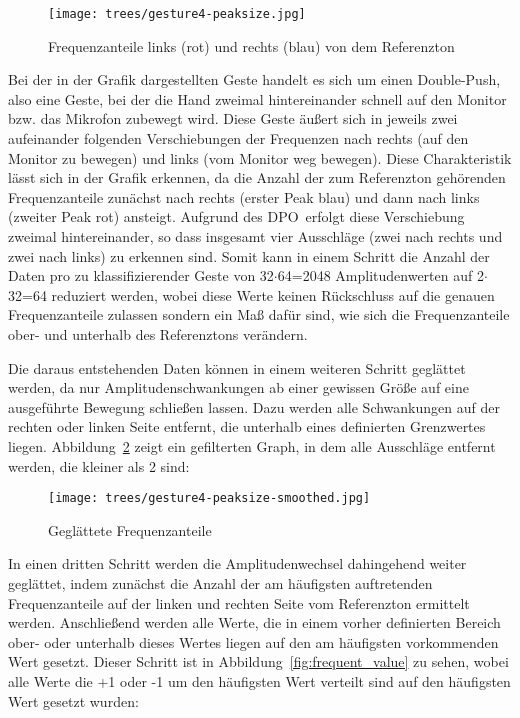 \begin{figure}[htbp] \centering
\texttt{[image: trees/gesture4-peaksize.jpg]}
\caption{Frequenzanteile links (rot) und rechts (blau) von dem Referenzton}
\label{fig:sum_of_bins}
\end{figure}

Bei der in der Grafik dargestellten Geste handelt es sich um einen \glqq Double-Push\grqq , also eine Geste, bei der die Hand zweimal 
hintereinander schnell auf den Monitor bzw. das Mikrofon zubewegt wird. Diese Geste äußert sich in jeweils zwei aufeinander folgenden 
Verschiebungen der Frequenzen nach rechts (auf den Monitor zu bewegen) und links (vom Monitor weg bewegen). 
Diese Charakteristik lässt sich in der Grafik erkennen, da die Anzahl der zum Referenzton gehörenden Frequenzanteile zunächst nach rechts (erster Peak blau) und dann nach links (zweiter Peak rot) ansteigt. Aufgrund des \glqq \acl{DPO}\grqq\ erfolgt diese 
Verschiebung zweimal hintereinander, so dass insgesamt vier Ausschläge (zwei nach rechts und zwei nach links) zu erkennen sind. 
Somit kann in einem Schritt die Anzahl der Daten pro zu klassifizierender Geste von 32$\cdot$64=2048 Amplitudenwerten 
auf 2$\cdot$32=64 reduziert werden, wobei diese Werte keinen Rückschluss auf die genauen Frequenzanteile zulassen sondern 
ein Maß dafür sind, wie sich die Frequenzanteile ober- und unterhalb des Referenztons verändern.

Die daraus entstehenden Daten können in einem weiteren Schritt geglättet werden, da nur Amplitudenschwankungen ab einer gewissen 
Größe auf eine ausgeführte Bewegung schließen lassen. Dazu werden alle Schwankungen auf der rechten oder linken Seite entfernt, 
die unterhalb eines definierten Grenzwertes liegen. 
Abbildung~\ref{fig:filtered} zeigt ein gefilterten Graph, in dem alle Ausschläge entfernt werden, die kleiner als 2 sind:

\begin{figure}[htbp] \centering
\texttt{[image: trees/gesture4-peaksize-smoothed.jpg]}
\caption{Geglättete Frequenzanteile}
\label{fig:filtered}
\end{figure}

In einen dritten Schritt werden die Amplitudenwechsel dahingehend weiter geglättet, indem zunächst die Anzahl der am häufigsten 
auftretenden Frequenzanteile auf der linken und rechten Seite vom Referenzton ermittelt werden. Anschließend werden alle Werte,
die in einem vorher definierten Bereich ober- oder unterhalb dieses Wertes liegen auf den am häufigsten vorkommenden Wert gesetzt.
Dieser Schritt ist in Abbildung~\ref{fig:frequent_value} zu sehen, wobei alle Werte die +1 oder -1 um den häufigsten Wert verteilt sind 
auf den häufigsten Wert gesetzt wurden:

